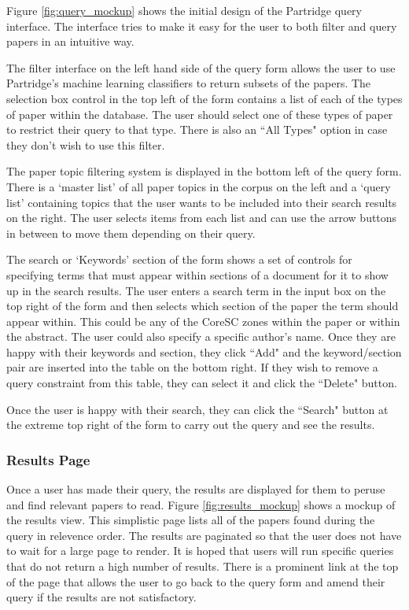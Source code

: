 Figure \ref{fig:query_mockup} shows the initial design of the Partridge query
interface. The interface tries to make it easy for the user to both filter and
query papers in an intuitive way.

The filter interface on the left hand side of the query form allows the user to
use Partridge's machine learning classifiers to return subsets of the papers.
The selection box control in the top left of the form contains a list of each
of the types of paper within the database. The user should select one of these
types of paper to restrict their query to that type. There is also an ``All
Types" option in case they don't wish to use this filter.

The paper topic filtering system is displayed in the bottom left of the query
form. There is a `master list' of all paper topics in the corpus on the left
and a `query list' containing topics that the user wants to be included into
their search results on the right. The user selects items from each list and
can use the arrow buttons in between to move them depending on their query.

The search or `Keywords' section of the form shows a set of controls for
specifying terms that must appear within sections of a document for it to show
up in the search results. The user enters a search term in the input box on the
top right of the form and then selects which section of the paper the term
should appear within. This could be any of the CoreSC zones within the paper or
within the abstract. The user could also specify a specific author's name. Once
they are happy with their keywords and section, they click ``Add" and the
keyword/section pair are inserted into the table on the bottom right. If they
wish to remove a query constraint from this table, they can select it and click
the ``Delete" button. 

Once the user is happy with their search, they can click the ``Search" button
at the extreme top right of the form to carry out the query and see the
results.

\subsubsection{ Results Page }

Once a user has made their query, the results are displayed for them to peruse
and find relevant papers to read. Figure \ref{fig:results_mockup} shows a
mockup of the results view. This simplistic page lists all of the papers found
during the query in relevence order. The results are paginated so that the user
does not have to wait for a large page to render. It is hoped that users will
run specific queries that do not return a high number of results. There is a
prominent link at the top of the page that allows the user to go back to the
query form and amend their query if the results are not satisfactory.

